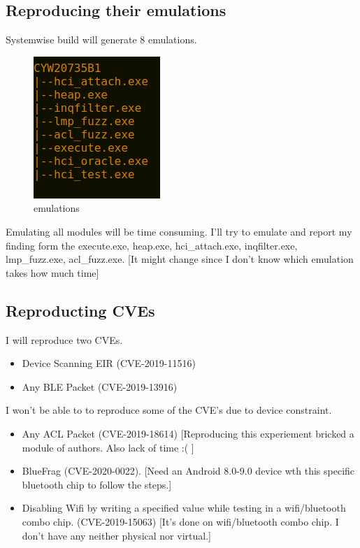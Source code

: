\documentclass[letterpaper,11pt]{article}
\begin{document}
\subsection{Reproducing their emulations} 
Systemwise build will generate 8 emulations. 
\begin{figure}[htp]
    \centering
    \includegraphics{images/building-sourcde-code.png}
    \caption{emulations}
    \label{fig:emulations}
\end{figure}
Emulating all modules will be time consuming. I'll try to emulate and report my finding form the execute.exe, heap.exe, hci\_attach.exe, inqfilter.exe, lmp\_fuzz.exe, acl\_fuzz.exe. [It might change since I don't know which emulation takes how much time]  
\subsection{Reproducting CVEs}
I will reproduce two CVEs. 
\begin{itemize}
    \item Device Scanning EIR (CVE-2019-11516)
    \item Any BLE Packet (CVE-2019-13916)
\end{itemize}
I won't be able to to reproduce some of the CVE's due to device constraint. 
\begin{itemize}
    \item Any ACL Packet (CVE-2019-18614) [Reproducing this experiement bricked a module of authors. Also lack of time :( ] 
    \item BlueFrag (CVE-2020-0022). [Need an Android 8.0-9.0 device wth this specific bluetooth chip to follow the steps.]
    \item Disabling Wifi by writing a specified value while testing in a wifi/bluetooth combo chip. (CVE-2019-15063) [It's done on wifi/bluetooth combo chip. I don't have any neither physical nor virtual.]
\end{itemize}

\end{document}
